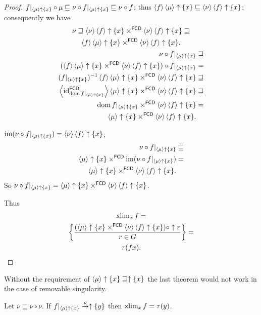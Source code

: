 \begin{proof}
$f|_{\left\langle \mu\right\rangle\uparrow\{x\}}\circ\mu\sqsubseteq\nu\circ f|_{\left\langle \mu\right\rangle\uparrow\{x\}}\sqsubseteq\nu\circ f$;
thus $\langle f\rangle\left\langle \mu\right\rangle\uparrow\{x\}\sqsubseteq\left\langle \nu\right\rangle\left\langle f\right\rangle\uparrow\{x\}$;
consequently we have
\begin{gather*}
\nu\sqsupseteq\left\langle \nu\right\rangle\left\langle f\right\rangle\uparrow\{x\}\times^{\mathsf{FCD}}\left\langle \nu\right\rangle\left\langle f\right\rangle\uparrow\{x\}\sqsupseteq\\\left\langle f\right\rangle\left\langle \mu\right\rangle\uparrow\{x\}\times^{\mathsf{FCD}}\left\langle \nu\right\rangle\left\langle f\right\rangle\uparrow\{x\}.\\
\begin{aligned}\nu\circ f|_{\left\langle \mu\right\rangle\uparrow\{x\}} & \sqsupseteq\\
(\left\langle f\right\rangle\left\langle \mu\right\rangle\uparrow\{x\}\times^{\mathsf{FCD}}\left\langle \nu\right\rangle\left\langle f\right\rangle\uparrow\{x\})\circ f|_{\left\langle \mu\right\rangle\uparrow\{x\}} & =\\
(f|_{\left\langle \mu\right\rangle\uparrow\{x\}})^{-1}\left\langle f\right\rangle\left\langle \mu\right\rangle\uparrow\{x\}\times^{\mathsf{FCD}}\left\langle \nu\right\rangle\left\langle f\right\rangle\uparrow\{x\} & \sqsupseteq\\
\left\langle \operatorname{id}_{\operatorname{dom} f|_{\left\langle \mu\right\rangle\uparrow\{x\}}}^{\mathsf{FCD}}\right\rangle\left\langle \mu\right\rangle\uparrow\{x\}\times^{\mathsf{FCD}}\left\langle \nu\right\rangle\left\langle f\right\rangle\uparrow\{x\} & \sqsupseteq\\
\operatorname{dom} f|_{\left\langle \mu\right\rangle\uparrow\{x\}}\times^{\mathsf{FCD}}\left\langle \nu\right\rangle\left\langle f\right\rangle\uparrow\{x\} & =\\
\left\langle \mu\right\rangle\uparrow\{x\}\times^{\mathsf{FCD}}\left\langle \nu\right\rangle\left\langle f\right\rangle\uparrow\{x\}.
\end{aligned}
\end{gather*}


$\operatorname{im}(\nu\circ f|_{\left\langle \mu\right\rangle\uparrow\{x\}})=\left\langle \nu\right\rangle\left\langle f\right\rangle\uparrow\{x\}$;
\begin{align*}
\nu\circ f|_{\left\langle \mu\right\rangle\uparrow\{x\}} & \sqsubseteq\\
\left\langle \mu\right\rangle\uparrow\{x\}\times^{\mathsf{FCD}}\operatorname{im}(\nu\circ f|_{\left\langle \mu\right\rangle\uparrow\{x\}}) & =\\
\left\langle \mu\right\rangle\uparrow\{x\}\times^{\mathsf{FCD}}\left\langle \nu\right\rangle\left\langle f\right\rangle\uparrow\{x\}.
\end{align*}
So $\nu\circ f|_{\left\langle \mu\right\rangle\uparrow\{x\}}=\left\langle \mu\right\rangle\uparrow\{x\}\times^{\mathsf{FCD}}\left\langle \nu\right\rangle\left\langle f\right\rangle\uparrow\{x\}$.

Thus
\begin{multline*}
\operatorname{xlim}_{x}f= \\ \left\{ \frac{(\left\langle \mu\right\rangle\uparrow\{x\}\times^{\mathsf{FCD}}\left\langle \nu\right\rangle\left\langle f\right\rangle\uparrow\{x\})\circ\uparrow r}{r\in G}\right\}= \\ \tau(fx).
\end{multline*}
\end{proof}
\begin{rem}
Without the requirement of $\left\langle \mu\right\rangle\uparrow\{x\}\sqsupseteq\uparrow\{x\}$
the last theorem would not work in the case of removable singularity.\end{rem}
\begin{thm}
Let $\nu\sqsubseteq\nu\circ\nu$. If $f|_{\left\langle \mu\right\rangle\uparrow\{x\}}\overset{\nu}{\rightarrow}\uparrow\{y\}$
then $\operatorname{xlim}_{x}f=\tau(y)$.\end{thm}

